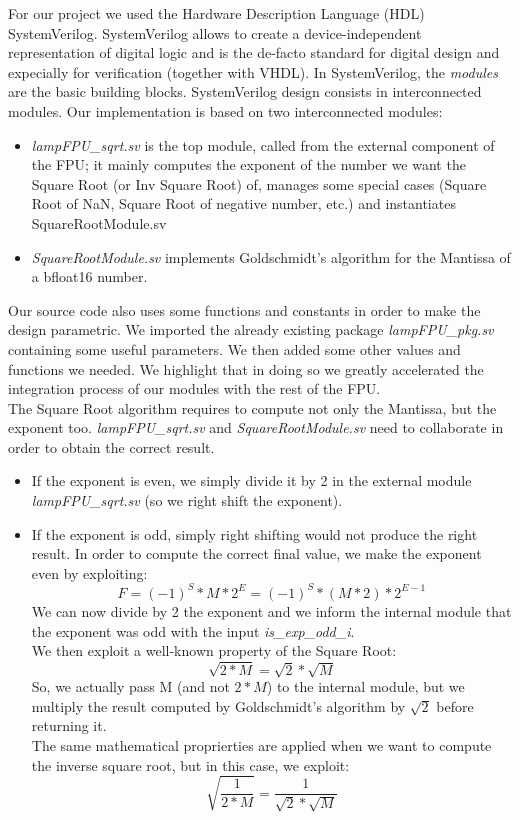For our project we used the Hardware Description Language (HDL) SystemVerilog. SystemVerilog allows to create a device-independent representation of digital logic and is the de-facto standard for digital design and expecially for verification (together with VHDL). 
In SystemVerilog, the \emph{modules} are the basic building blocks. SystemVerilog design consists in interconnected modules.
Our implementation is based on two interconnected modules:

\begin{itemize}
\item \emph{lampFPU\_sqrt.sv} is the top module, called from the external component of the FPU; it mainly computes the exponent of the number we want the Square Root (or Inv Square Root) of, manages some special cases (Square Root of NaN, Square Root of negative number, etc.) and instantiates SquareRootModule.sv
\item \emph{SquareRootModule.sv} implements Goldschmidt's algorithm for the Mantissa of a bfloat16 number. 
\end{itemize}

Our source code also uses some functions and constants in order to make the design parametric. We imported the already existing package \emph{lampFPU\_pkg.sv} containing some useful parameters. We then added some other values and functions we needed. We highlight that in doing so we greatly accelerated the integration process of our modules with the rest of the FPU. \\

The Square Root algorithm requires to compute not only the Mantissa, but the exponent too. \emph{lampFPU\_sqrt.sv} and  \emph{SquareRootModule.sv} need to collaborate in order to obtain the correct result. 
\begin{itemize}
\item If the exponent is even, we simply divide it by 2 in the external module \emph{lampFPU\_sqrt.sv}  (so we right shift the exponent).
\item If the exponent is odd, simply right shifting would not produce the right result. In order to compute the correct final value, we make the exponent even by exploiting:
$$F = (-1)^{S}*M*2^{E}  = (-1)^{S}*(M*2)*2^{E-1} $$
We can now divide by 2 the exponent and we inform the internal module that the exponent was odd with the input \emph{is\_exp\_odd\_i}. \\
We then exploit a well-known property of the Square Root:
$$ \sqrt{2*M} = \sqrt{2} * \sqrt{M} $$
So, we actually pass M (and not $2 * M$) to the internal module, but we multiply the result computed by Goldschmidt's algorithm by $\sqrt{2}$ before returning it.\\
The same mathematical proprierties are applied when we want to compute the inverse square root, but in this case, we exploit:
$$ \sqrt{\frac{1}{2*M}} = \frac{1}{\sqrt{2} * \sqrt{M}} $$
\end{itemize} 

